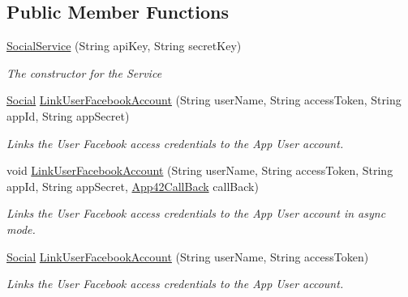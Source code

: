 \subsection*{Public Member Functions}
\begin{DoxyCompactItemize}
\item 
\hyperlink{classcom_1_1shephertz_1_1app42_1_1paas_1_1sdk_1_1csharp_1_1social_1_1_social_service_aa118a2c14267d05b44f94ca799841ae1}{Social\+Service} (String api\+Key, String secret\+Key)
\begin{DoxyCompactList}\small\item\em The constructor for the Service \end{DoxyCompactList}\item 
\hyperlink{classcom_1_1shephertz_1_1app42_1_1paas_1_1sdk_1_1csharp_1_1social_1_1_social}{Social} \hyperlink{classcom_1_1shephertz_1_1app42_1_1paas_1_1sdk_1_1csharp_1_1social_1_1_social_service_a0de706b00073cf53d5e7f018186f13d6}{Link\+User\+Facebook\+Account} (String user\+Name, String access\+Token, String app\+Id, String app\+Secret)
\begin{DoxyCompactList}\small\item\em Links the User Facebook access credentials to the App User account. \end{DoxyCompactList}\item 
void \hyperlink{classcom_1_1shephertz_1_1app42_1_1paas_1_1sdk_1_1csharp_1_1social_1_1_social_service_ae1523690b55a64dc3331f257831489b2}{Link\+User\+Facebook\+Account} (String user\+Name, String access\+Token, String app\+Id, String app\+Secret, \hyperlink{interfacecom_1_1shephertz_1_1app42_1_1paas_1_1sdk_1_1csharp_1_1_app42_call_back}{App42\+Call\+Back} call\+Back)
\begin{DoxyCompactList}\small\item\em Links the User Facebook access credentials to the App User account in async mode. \end{DoxyCompactList}\item 
\hyperlink{classcom_1_1shephertz_1_1app42_1_1paas_1_1sdk_1_1csharp_1_1social_1_1_social}{Social} \hyperlink{classcom_1_1shephertz_1_1app42_1_1paas_1_1sdk_1_1csharp_1_1social_1_1_social_service_a98854870583bd426561902525835c337}{Link\+User\+Facebook\+Account} (String user\+Name, String access\+Token)
\begin{DoxyCompactList}\small\item\em Links the User Facebook access credentials to the App User account. \end{DoxyCompactList}\item 

\end{DoxyCompactItemize}
